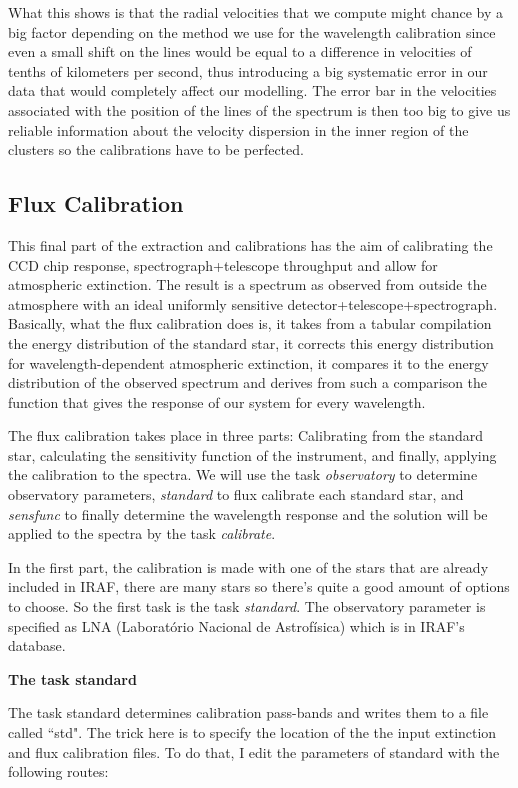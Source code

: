 What this shows is that the radial velocities that we compute might chance by a big factor depending on the method we use for the wavelength calibration since even a small shift on the lines would be equal to a difference in velocities of tenths of kilometers per second, thus introducing a big systematic error in our data that would completely affect our modelling. The error bar in the velocities associated with the position of the lines of the spectrum is then too big to give us reliable information about the velocity dispersion in the inner region of the clusters so the calibrations have to be perfected.


\subsection{Flux Calibration}

This final part of the extraction and calibrations has the aim of calibrating the CCD chip response, spectrograph+telescope throughput and allow for atmospheric extinction. The result is a spectrum as observed from outside the atmosphere with an ideal uniformly sensitive detector+telescope+spectrograph. Basically, what the flux calibration does is, it takes from a tabular compilation the energy distribution of the standard star, it corrects this energy distribution for wavelength-dependent atmospheric extinction, it compares it to the energy distribution of the observed spectrum and derives from such a comparison the function that gives the response of our system for every wavelength.

The flux calibration takes place in three parts: Calibrating from the standard star, calculating the sensitivity function of the instrument, and finally, applying the calibration to the spectra. We will use the task \textit{observatory} to determine observatory parameters, \textit{standard} to flux calibrate each standard star, and \textit{sensfunc} to finally determine the wavelength response and the solution will be applied to the spectra by the task \textit{calibrate}.

In the first part, the calibration is made with one of the stars that are already included in IRAF, there are many stars so there's quite a good amount of options to choose. So the first task is the task \textit{standard}. The observatory parameter is specified as LNA (Laborat\'orio Nacional de Astrof\'isica) which is in IRAF's database. 

\textbf{The task standard}

The task standard determines calibration pass-bands and writes them to a file called ``std". The trick here is to specify the location of the the input extinction and flux calibration files. To do that, I edit the parameters of standard with the following routes:

